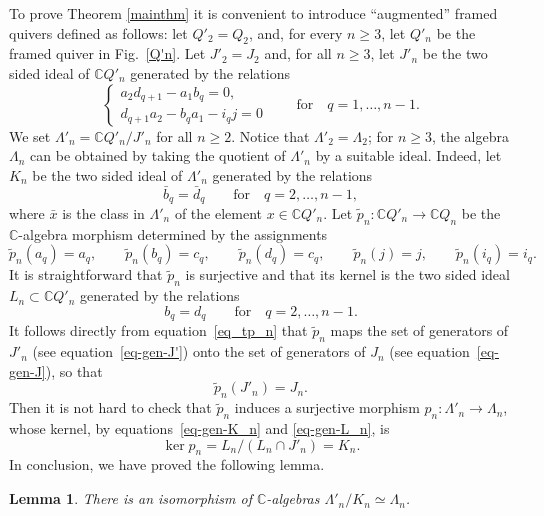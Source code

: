 \documentclass[pdftex]{sigma}
\numberwithin{equation}{section}
\newtheorem{Lemma}[Theorem]{Lemma}
\begin{document}
To prove Theorem \ref{mainthm} it is convenient to introduce ``augmented'' framed quivers defined as follows:
let $Q'_{2}= Q_2$, and, for every $n\geq 3$, let $Q'_{n}$ be the framed quiver in Fig.~\ref{Q'n}. Let $J'_{2}= J_2$ and, for all $n\geq 3$, let $J'_{n}$ be the two sided ideal of $\mathbb{C} Q'_{n}$ generated by the relations
\begin{equation}
\begin{cases}
a_2d_{q+1}-a_1b_q =0, \\
d_{q+1}a_2-b_qa_1-i_qj =0
\end{cases}\qquad\text{for}\quad q=1,\dots,n-1 .
\label{eq-gen-J'}
\end{equation}
We set $\Lambda'_{n}=\mathbb{C} Q'_{n}/J'_{n}$ for all $n\geq2$. Notice that $\Lambda'_{2}=\Lambda_{2}$;
for $n\geq 3$, the algebra $\Lambda_{n}$ can be obtained by taking the quotient of $\Lambda'_{n}$ by a suitable ideal.
Indeed, let $K_{n}$ be the two sided ideal of $\Lambda'_{n}$ generated by the relations
\begin{equation}
\bar{b}_{q}=\bar{d}_q\qquad\text{for}\quad q=2,\dots, n-1 ,\label{eq-gen-K_n}
\end{equation}
where $\bar{x}$ is the class in $\Lambda'_{n}$ of the element $x \in \mathbb{C} Q'_{n}$.
Let $\tilde{p}_{n}\colon\mathbb{C} Q'_{n}\longrightarrow\mathbb{C} Q_{n}$ be the $\mathbb{C}$-algebra morphism determined by the assignments
\begin{equation}\label{eq_tp_n}
\tilde{p}_{n}(a_q) = a_q , \qquad \tilde{p}_{n}(b_q) = c_q ,\qquad \tilde{p}_{n}(d_q) = c_{q} ,\qquad
\tilde{p}_{n}(j) = j , \qquad \tilde{p}_{n}(i_q) = i_q .
\end{equation}
It is straightforward that $\tilde{p}_{n}$ is surjective and that its kernel is the two sided ideal $L_{n}\subset \mathbb{C} Q'_{n}$ generated by the relations
\begin{equation}
b_{q}=d_{q}\qquad\text{for}\quad q=2,\dots,n-1 .
\label{eq-gen-L_n}
\end{equation}
It follows directly from equation~\eqref{eq_tp_n} that $\tilde{p}_n$ maps the set of generators of $J'_n$ (see equation~\eqref{eq-gen-J'}) onto the set of generators of $J_n$ (see equation~\eqref{eq-gen-J}), so that
\begin{equation*}
\tilde{p}_{n}(J'_{n}) =J_{n} .
\end{equation*}
Then it is not hard to check that $\tilde{p}_{n}$ induces a surjective morphism $p_n\colon \Lambda'_n \to \Lambda_n$,
whose kernel, by equations~\eqref{eq-gen-K_n} and \eqref{eq-gen-L_n}, is
\begin{equation*}
\ker p_{n}= L_{n}/(L_{n}\cap J'_{n})=K_{n} .
\end{equation*}
In conclusion, we have proved the following lemma.
\begin{Lemma}\label{lm-Lambda'-->>Lambda}
There is an isomorphism of $\mathbb{C}$-algebras $\Lambda'_{n}/K_{n}\simeq \Lambda_{n}$.
\end{Lemma}
\end{document}
